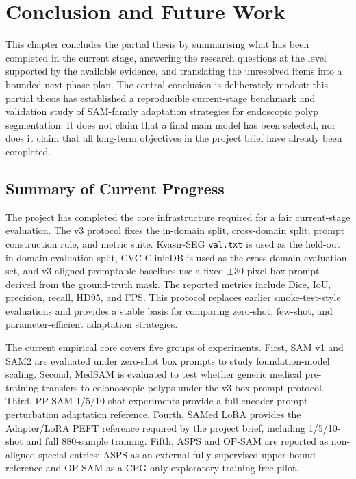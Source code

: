 
\chapter{Conclusion and Future Work}
\label{chap:conclusion}

This chapter concludes the partial thesis by summarising what has been completed in the current stage, answering the research questions at the level supported by the available evidence, and translating the unresolved items into a bounded next-phase plan. The central conclusion is deliberately modest: this partial thesis has established a reproducible current-stage benchmark and validation study of SAM-family adaptation strategies for endoscopic polyp segmentation. It does not claim that a final main model has been selected, nor does it claim that all long-term objectives in the project brief have already been completed.

\section{Summary of Current Progress}
\label{sec:summary-progress}

The project has completed the core infrastructure required for a fair current-stage evaluation. The v3 protocol fixes the in-domain split, cross-domain split, prompt construction rule, and metric suite. Kvasir-SEG \texttt{val.txt} is used as the held-out in-domain evaluation split, CVC-ClinicDB is used as the cross-domain evaluation set, and v3-aligned promptable baselines use a fixed $\pm30$ pixel box prompt derived from the ground-truth mask. The reported metrics include Dice, IoU, precision, recall, HD95, and FPS. This protocol replaces earlier smoke-test-style evaluations and provides a stable basis for comparing zero-shot, few-shot, and parameter-efficient adaptation strategies.

The current empirical core covers five groups of experiments. First, SAM v1 and SAM2 are evaluated under zero-shot box prompts to study foundation-model scaling. Second, MedSAM is evaluated to test whether generic medical pre-training transfers to colonoscopic polyps under the v3 box-prompt protocol. Third, PP-SAM 1/5/10-shot experiments provide a full-encoder prompt-perturbation adaptation reference. Fourth, SAMed LoRA provides the Adapter/LoRA PEFT reference required by the project brief, including 1/5/10-shot and full 880-sample training. Fifth, ASPS and OP-SAM are reported as non-aligned special entries: ASPS as an external fully supervised upper-bound reference and OP-SAM as a CPG-only exploratory training-free pilot.

